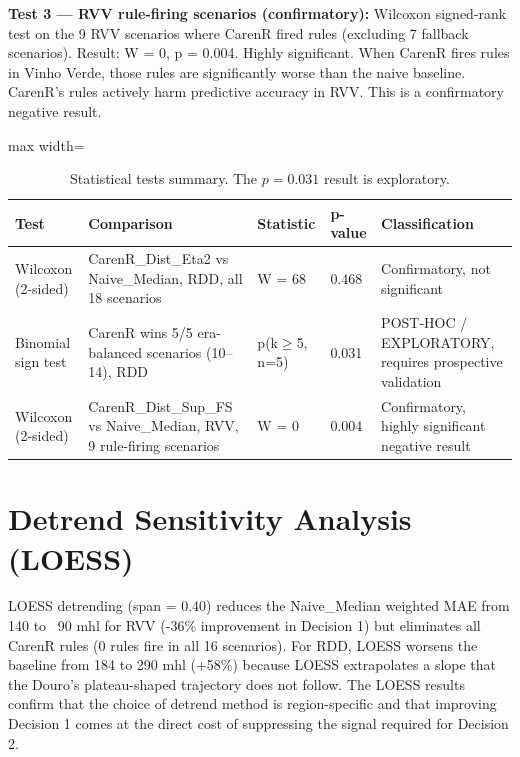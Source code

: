\textbf{Test 3 --- RVV rule-firing scenarios (confirmatory): }Wilcoxon signed-rank test on the 9 RVV scenarios where CarenR fired rules (excluding 7 fallback scenarios). Result: W = 0, p = 0.004. Highly significant. When CarenR fires rules in Vinho Verde, those rules are significantly worse than the naive baseline. CarenR's rules actively harm predictive accuracy in RVV. This is a confirmatory negative result.

\begin{table}[htbp]
  \centering
  \caption{Statistical tests summary. The $p=0.031$ result is exploratory.}\label{tab:ch5a_6}
  \small
  \begin{adjustbox}{max width=\textwidth}
    \begin{tabularx}{\textwidth}{p{2.2cm}|p{3.8cm}|p{1.6cm}|p{1.2cm}|X}
  \toprule
  Test & Comparison & Statistic & p-value & Classification \\
  \midrule
  Wilcoxon (2-sided) & CarenR\_Dist\_Eta2 vs Naive\_Median, RDD, all 18 scenarios & W = 68 & 0.468 & Confirmatory, not significant \\
  Binomial sign test & CarenR wins 5/5 era-balanced scenarios (10--14), RDD & p(k$\geq$5, n=5) & 0.031 & POST-HOC / EXPLORATORY, requires prospective validation \\
  Wilcoxon (2-sided) & CarenR\_Dist\_Sup\_FS vs Naive\_Median, RVV, 9 rule-firing scenarios & W = 0 & 0.004 & Confirmatory, highly significant negative result \\
  \bottomrule
\end{tabularx}
  \end{adjustbox}

\end{table}



\section{Detrend Sensitivity Analysis (LOESS)}\label{sec:detrend_sensitivity_analysis_loess}

LOESS detrending (span = 0.40) reduces the Naive\_Median weighted MAE from 140 to ~90 mhl for RVV (-36\% improvement in Decision 1) but eliminates all CarenR rules (0 rules fire in all 16 scenarios). For RDD, LOESS worsens the baseline from 184 to 290 mhl (+58\%) because LOESS extrapolates a slope that the Douro's plateau-shaped trajectory does not follow. The LOESS results confirm that the choice of detrend method is region-specific and that improving Decision 1 comes at the direct cost of suppressing the signal required for Decision 2.

